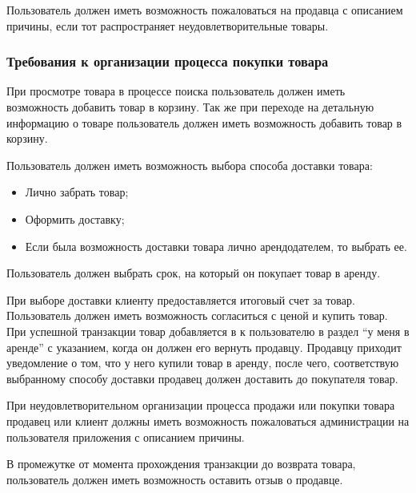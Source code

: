 Пользователь должен иметь возможность пожаловаться на продавца с описанием причины, если тот распространяет неудовлетворительные товары.

\subsubsection{Требования к организации процесса покупки товара}\hfill

При просмотре товара в процессе поиска пользователь должен иметь возможность добавить товар в корзину.
Так же при переходе на детальную информацию о товаре пользователь должен иметь возможность добавить товар в корзину.

Пользователь должен иметь возможность выбора способа доставки товара:
\begin{itemize}
    \item Лично забрать товар;
    \item Оформить доставку;
    \item Если была возможность доставки товара лично арендодателем, то выбрать ее.
\end{itemize}

Пользователь должен выбрать срок, на который он покупает товар в аренду.

При выборе доставки клиенту предоставляется итоговый счет за товар.
Пользователь должен иметь возможность согласиться с ценой и купить товар.
При успешной транзакции товар добавляется в к пользователю в раздел “у меня в аренде” с указанием, когда он должен его вернуть продавцу.
Продавцу приходит уведомление о том, что у него купили товар в аренду, после чего, соответствую выбранному способу доставки продавец должен доставить до покупателя товар.

При неудовлетворительном организации процесса продажи или покупки товара продавец или клиент должны иметь возможность пожаловаться администрации на пользователя приложения с описанием причины.

В промежутке от момента прохождения транзакции до возврата товара, пользователь должен иметь возможность оставить отзыв о продавце.

